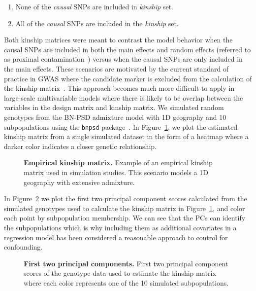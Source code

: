 \documentclass[10pt,letterpaper]{article}
\begin{document}
\begin{enumerate}
	\item None of the \textit{causal} SNPs are included in \textit{kinship} set.
	\item All of the \textit{causal} SNPs are included in the \textit{kinship} set.
\end{enumerate}

Both kinship matrices were meant to contrast the model behavior when the causal SNPs are included in both the main effects and random effects (referred to as proximal contamination~\cite{lippert2011fast}) versus when the causal SNPs are only included in the main effects. These scenarios are motivated by the current standard of practice in GWAS where the candidate marker is excluded from the calculation of the kinship matrix~\cite{lippert2011fast}. This approach becomes much more difficult to apply in large-scale multivariable models where there is likely to be overlap between the variables in the design matrix and kinship matrix. We simulated random genotypes from the BN-PSD admixture model with 1D geography and 10 subpopulations using the \texttt{bnpsd} package~\cite{bnpsd1,bnpsd2}. In Figure~\ref{fig:plot-kinship-sim}, we plot the estimated kinship matrix from a 
single simulated dataset in the form of a heatmap where a darker color indicates a closer genetic relationship. 


\begin{figure}[!h]
	\caption{{\bf Empirical kinship matrix.}
		Example of an empirical kinship matrix used in simulation studies. This scenario models a 1D geography with extensive admixture.}
	\label{fig:plot-kinship-sim}
\end{figure}



In Figure~\ref{fig:plot-pc-sim} we plot the first two principal component scores calculated from the simulated 
genotypes used to calculate the kinship matrix in Figure~\ref{fig:plot-kinship-sim}, and color each point by 
subpopulation membership. We can see that the PCs can identify the subpopulations which is why including them 
as additional covariates in a regression model has been considered a reasonable approach to control for confounding.


\begin{figure}[!h]
	\caption{{\bf First two principal components.}
		First two principal component scores of the genotype data used to estimate the kinship matrix where each color represents one of the 10 simulated subpopulations.}
	\label{fig:plot-pc-sim}
\end{figure}
\end{document}
